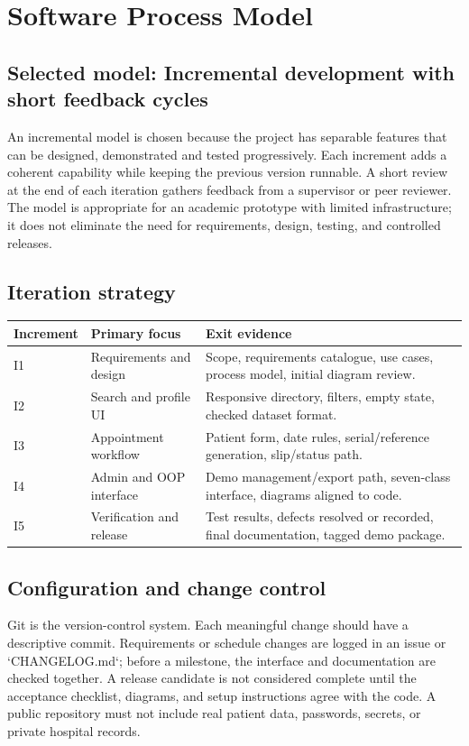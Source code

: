 \documentclass[11pt,a4paper]{article}
\begin{document}
\section{Software Process Model}
\subsection{Selected model: Incremental development with short feedback cycles}
An incremental model is chosen because the project has separable features that can be designed, demonstrated and tested progressively. Each increment adds a coherent capability while keeping the previous version runnable. A short review at the end of each iteration gathers feedback from a supervisor or peer reviewer. The model is appropriate for an academic prototype with limited infrastructure; it does not eliminate the need for requirements, design, testing, and controlled releases.

\subsection{Iteration strategy}
\begin{tabularx}{\textwidth}{p{1.4cm}p{3.0cm}X}
\toprule \textbf{Increment} & \textbf{Primary focus} & \textbf{Exit evidence}\\\midrule
I1 & Requirements and design & Scope, requirements catalogue, use cases, process model, initial diagram review.\\
I2 & Search and profile UI & Responsive directory, filters, empty state, checked dataset format.\\
I3 & Appointment workflow & Patient form, date rules, serial/reference generation, slip/status path.\\
I4 & Admin and OOP interface & Demo management/export path, seven-class interface, diagrams aligned to code.\\
I5 & Verification and release & Test results, defects resolved or recorded, final documentation, tagged demo package.\\
\bottomrule
\end{tabularx}

\subsection{Configuration and change control}
Git is the version-control system. Each meaningful change should have a descriptive commit. Requirements or schedule changes are logged in an issue or `CHANGELOG.md`; before a milestone, the interface and documentation are checked together. A release candidate is not considered complete until the acceptance checklist, diagrams, and setup instructions agree with the code. A public repository must not include real patient data, passwords, secrets, or private hospital records.
\end{document}
